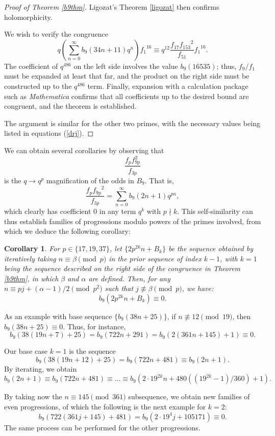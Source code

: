 \documentclass[12pt]{amsart}
\newtheorem{corollary}[theorem]{Corollary}
\theoremstyle{definition}
\begin{document}
\begin{proof}[Proof of Theorem \ref{b9thm}]
Ligozat's Theorem \ref{ligozat} then confirms holomorphicity.

We wish to verify the congruence $$q \left( \sum_{n=0}^\infty b_9(34n+11) q^n \right) {f_1}^{16} \equiv q^{12} \frac{f_{17} {f_{153}}^2}{f_{51}} {f_1}^{16}.$$  The coefficient of $q^{486}$ on the left side involves the value $b_9(16535)$; thus, $f_9 / f_1$ must be expanded at least that far, and the product on the right side must be constructed up to the $q^{486}$ term. Finally, expansion with a calculation package such as \emph{Mathematica} confirms that all coefficients up to the desired bound are congruent, and the theorem is established.

The argument is similar for the other two primes, with the necessary values being listed in equations (\ref{drj}). \end{proof}

We can obtain several corollaries by observing that $$\frac{f_p f_{9p}^2}{f_{3p}}$$ is the $q \rightarrow q^p$ magnification of the odds in $B_9$. That is,
$$\frac{f_p{f_{9p}}^2}{f_{3p}} = \sum_{n=0}^\infty b_9(2n+1) q^{pn},$$
which clearly has coefficient 0 in any term $q^k$ with $p \nmid k$.  This self-similarity can thus establish families of progressions modulo powers of the primes involved, from which we deduce the following corollary:
\begin{corollary}\label{b9cor} For $p \in \{17, 19, 37\}$, let $\{ 2 p^{2k} n + B_k \}$ be the sequence obtained by iteratively taking $n \equiv \beta \pmod{p}$ in the prior sequence of index $k-1$, with $k=1$ being the sequence described on the right side of the congruence in Theorem \ref{b9thm}, in which $\beta$ and $\alpha$ are defined.  Then, for any $n \equiv pj + (\alpha-1)/2 \pmod{p^2}$ such that $j \not\equiv \beta \pmod{p}$, we have: $$b_9(2 p^{2k} n  + B_k) \equiv 0 .$$
\end{corollary}

As an example with base sequence $\{b_9(38n+25)\}$, if $n \not\equiv 12 \pmod{19}$, then $b_9(38n+25) \equiv 0 $. Thus,  for instance, $$b_9(38(19n+7)+25) = b_9(722n+291) = b_9(2(361n+145)+1) \equiv 0 .$$

Our base case $k=1$ is the sequence $$b_9(38(19n+12)+25)  = b_9(722n + 481) \equiv b_9(2n+1) .$$ By iterating, we obtain $$b_9(2n+1) \equiv b_9(722n+481) \equiv \dots \equiv b_9 \left( 2 \cdot 19^{2k} n + 480 ((19^{2k}-1)/360) + 1\right).$$

By taking now the $n \equiv 145 \pmod{361}$ subsequence, we obtain new families of even progressions, of which the following is the next example for $k=2$: $$b_9(722(361j+145) + 481) = b_9 (2 \cdot 19^4 j + 105171) \equiv 0.$$ The same process can be performed for the other progressions.
\end{document}
